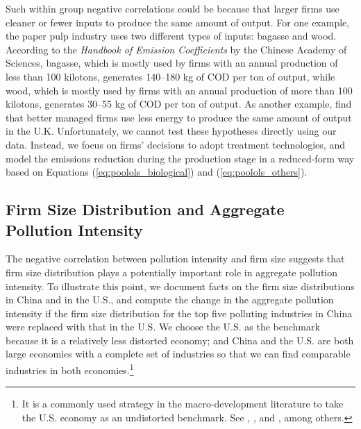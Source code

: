 \documentclass[AEJ]{AEA}
\begin{document}
Such within group negative correlations could be because that larger firms use cleaner or fewer inputs to produce the same amount of output. For one example, the paper pulp industry uses two different types of inputs: bagasse and wood. According to the \textit{Handbook of Emission Coefficients} by the Chinese Academy of Sciences, bagasse, which is mostly used by firms with an annual production of less than 100 kilotons, generates 140--180 kg of COD per ton of output, while wood, which is mostly used by firms with an annual production of more than 100 kilotons, generates 30--55 kg of COD per ton of output. As another example, \citet{Bloometal:2010} find that better managed firms use less energy to produce the same amount of output in the U.K. Unfortunately, we cannot test these hypotheses directly using our data. Instead, we focus on firms' decisions to adopt treatment technologies, and model the emissions reduction during the production stage in a reduced-form way based on Equations (\ref{eq:poolols_biological}) and (\ref{eq:poolols_others}).

\subsection{Firm Size Distribution and Aggregate Pollution Intensity}

The negative correlation between pollution intensity and firm size suggests that firm size distribution plays a potentially important role in aggregate pollution intensity. To illustrate this point, we document facts on the firm size distributions in China and in the U.S., and compute the change in the aggregate pollution intensity if the firm size distribution for the top five polluting industries in China were replaced with that in the U.S. We choose the U.S. as the benchmark because it is a relatively less distorted economy; and China and the U.S. are both large economies with a complete set of industries so that we can find comparable industries in both economies.\footnote{It is a commonly used strategy in the macro-development literature to take the U.S. economy as an undistorted benchmark. See \citet{Guneretal:2008}, \citet{HsiehKlenow:2009, HsiehKlenow:2014}, \citet{Bartelsmanetal:2013} and \citet{AdamopoulosRestuccia:2014}, among others.}
\end{document}
